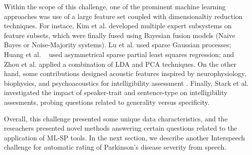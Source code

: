 \documentclass{article}
\begin{document}
Within the scope of this challenge, one of the prominent machine learning approaches was use of a large feature set coupled with dimensionaltiy reduction techniques. For instace, Kim et al. \cite{kim2012intelligibility} developed multiple expert subsystems on feature subsets, which were finally fused using Bayesian fusion models (Naive Bayes or Noise-Majority systems). Lu et al. \cite{lu2012predicting} used sparse Gaussian processes; Huang et al. ~\cite{huang2012detecting} used asymmetrical sparse partial least squares regression; and Zhou et al. \cite{zhou2012automatic} applied a combination of LDA and PCA techniques. On the other hand, some contributions designed acoustic features inspired by neurophysiology, biophysics, and psychoacoustics for intelligibility assessment \cite{zhou2012automatic}. Finally, Stark et al. \cite{stark2012interspeech} investigated the impact of speaker-trait and sentence-type on intelligibility assesments, probing questions related to generality versus specificity.

Overall, this challenge presented some unique data characteristics, and the reseachers presented novel methods answering certain questions related to the application of ML-SP tools. In the next section, we describe another Interspeech challenge for automatic rating of Parkinson's disease severity from speech. 


\end{document}
